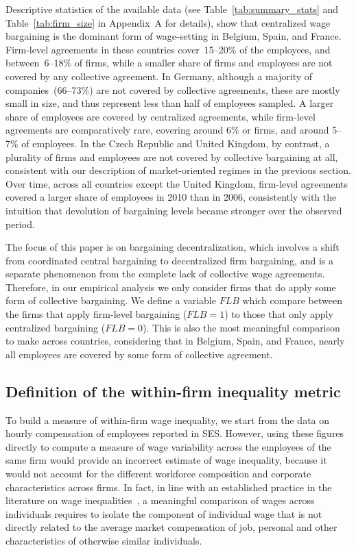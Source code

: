 \documentclass[12pt]{article}
\begin{document}
Descriptive statistics of the available data (see Table~\ref{tab:summary_stats} and Table~\ref{tab:firm_size} in Appendix~A for details), show that centralized wage bargaining is the dominant form of wage-setting in Belgium, Spain, and France. Firm-level agreements in these countries cover~15--20\% of the employees, and between~6--18\% of firms, while a smaller share of firms and employees are not covered by any collective agreement. In Germany, although a majority of companies~(66--73\%) are not covered by collective agreements, these are mostly small in size, and thus represent less than half of employees sampled. A larger share of employees are covered by centralized agreements, while firm-level agreements are comparatively rare, covering around 6\% or firms, and around 5--7\% of employees. In the Czech Republic and United Kingdom, by contrast, a plurality of firms and employees are not covered by collective bargaining at all, consistent with our description of market-oriented regimes in the previous section. 
Over time, across all countries except the United Kingdom, firm-level agreements covered a larger share of employees in 2010 than in 2006, consistently with the intuition that devolution of bargaining levels became stronger over the observed period.

The focus of this paper is on bargaining decentralization, which involves a shift from coordinated central bargaining to decentralized firm bargaining, and is a separate phenomenon from the complete lack of collective wage agreements. Therefore, in our empirical analysis we only consider firms that do apply some form of collective bargaining. We define a variable $\mathit{FLB}$ which compare between the firms that apply firm-level bargaining ($\mathit{FLB}=1$) to those that only apply centralized bargaining ($\mathit{FLB}=0$).
This is also the most meaningful comparison to make across countries, considering that in Belgium, Spain, and France, nearly all employees are covered by some form of collective agreement.


\subsection*{Definition of the within-firm inequality metric}
\label{sec: inequality}
To build a measure of within-firm wage inequality, we start from the data on hourly compensation of employees reported in SES. However, using these figures directly to compute a measure of wage variability across the employees of the same firm would provide an incorrect estimate of wage inequality, because it would not account for the different workforce composition and corporate characteristics across firms. In fact, in line with an established practice in the literature on wage inequalities~\citep[dating at least since][]{winter.ebmer.1999}, a meaningful comparison of wages across individuals requires to isolate the component of individual wage that is not directly related to the average market compensation of job, personal and other characteristics of otherwise similar individuals.
\end{document}
